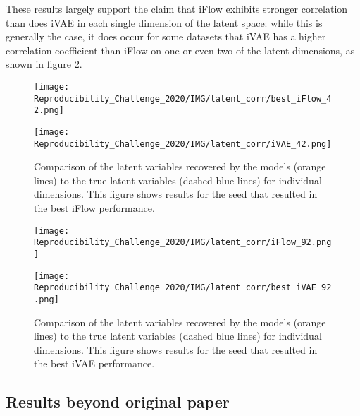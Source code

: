 These results largely support the claim that iFlow exhibits stronger correlation than does iVAE in each single dimension of the latent space: while this is generally the case, it does occur for some datasets that iVAE has a higher correlation coefficient than iFlow on one or even two of the latent dimensions, as shown in figure \ref{fig:latentcorr2}.

\begin{figure}[!htbp]
    \centering
    \begin{minipage}[b]{\textwidth}
        \centering
       \texttt{[image: Reproducibility\_Challenge\_2020/IMG/latent\_corr/best\_iFlow\_42.png]}
    \end{minipage}
    \begin{minipage}[b]{\textwidth}
    \centering
       \texttt{[image: Reproducibility\_Challenge\_2020/IMG/latent\_corr/iVAE\_42.png]}
    \end{minipage}
    \caption{Comparison of the latent variables recovered by the models (orange lines) to the true latent variables (dashed blue lines) for individual dimensions. This figure shows results for the seed that resulted in the best iFlow performance.}
    \label{fig:latentcorr1}
\end{figure}

\begin{figure}[!htbp]
    \centering
    \begin{minipage}[b]{\textwidth}
        \centering
       \texttt{[image: Reproducibility\_Challenge\_2020/IMG/latent\_corr/iFlow\_92.png]}
    \end{minipage}
    \begin{minipage}[b]{\textwidth}
    \centering
       \texttt{[image: Reproducibility\_Challenge\_2020/IMG/latent\_corr/best\_iVAE\_92.png]}
    \end{minipage}
    \caption{Comparison of the latent variables recovered by the models (orange lines) to the true latent variables (dashed blue lines) for individual dimensions. This figure shows results for the seed that resulted in the best iVAE performance.}
    \label{fig:latentcorr2}
\end{figure}

\newpage

\subsection{Results beyond original paper}

